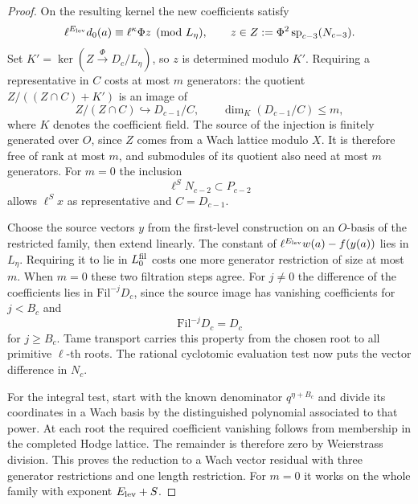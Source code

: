 \begin{proof}
On the resulting kernel the new coefficients satisfy
\[
 \ell^{E_{\rm lev}}d_0(a)\equiv\ell^\kappa\Phi z\pmod{L_\eta},
 \qquad z\in Z:=\Phi^2\operatorname{sp}_{c-3}(N_{c-3}).
\]
Set \(K'=\ker(Z\xrightarrow{\,\Phi\,}D_c/L_\eta)\), so \(z\) is determined modulo
\(K'\). Requiring a representative in \(C\) costs at most \(m\)
generators: the quotient \(Z/((Z\cap C)+K')\) is an image of
\[
 Z/(Z\cap C)\hookrightarrow D_{c-1}/C,\qquad
 \dim_K(D_{c-1}/C)\le m ,
\]
where \(K\) denotes the coefficient field. The source of the
injection is finitely generated over \(O\), since \(Z\) comes from
a Wach lattice modulo \(X\). It is therefore free of rank at most
\(m\), and submodules of its quotient also need at most \(m\)
generators. For \(m=0\) the inclusion
\[
 \ell^S N_{c-2}\subset P_{c-2}
\]
allows \(\ell^S x\) as representative and
\(C=D_{c-1}\).

Choose the source vectors \(y\) from the first-level construction on
an \(O\)-basis of the restricted family, then extend linearly.
The constant of \(\ell^{E_{\rm lev}}w(a)-f(y(a))\) lies in
\(L_\eta\). Requiring it to lie in \(L_0^{\rm fil}\) costs one more
generator restriction of size at most \(m\). When \(m=0\) these
two filtration steps agree. For \(j\ne0\) the difference of
the coefficients lies in \(\mathrm{Fil}^{-j}D_c\), since the
source image has vanishing coefficients for \(j<B_c\) and
\[
 \mathrm{Fil}^{-j}D_c=D_c
\]
for \(j\ge B_c\).
Tame transport carries this property from the chosen root to
all primitive \(\ell\)-th roots. The rational cyclotomic
evaluation test now puts the vector difference in \(N_c\).

For the integral test, start with the known denominator
\(q^{\eta+B_c}\) and divide its coordinates in a Wach basis by the
distinguished polynomial associated to that power. At each root the
required coefficient vanishing follows from membership in the
completed Hodge lattice. The remainder is therefore zero by
Weierstrass division. This proves the reduction to a Wach vector
residual with three generator restrictions and one length restriction.
For \(m=0\) it works on the whole family with exponent
\(E_{\rm lev}+S\).

\end{proof}
